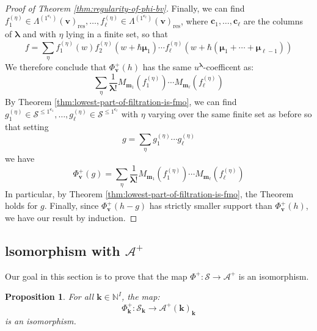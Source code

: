 \documentclass[11pt,reqno]{amsart}
\renewcommand{\mathbf}{\mathbold}
\numberwithin{equation}{section}
\newtheorem{Proposition}[equation]{Proposition}
\theoremstyle{definition}
\newcommand{\cA}{\mathcal{A}}
\newcommand{\cS}{\mathcal{S}}
\newcommand{\bc}{\mathbf{c}}
\newcommand{\bk}{\mathbf{k}}
\newcommand{\bm}{\mathbf{m}}
\newcommand{\bv}{\mathbf{v}}
\newcommand{\NN}{\mathbb{N}}
\renewcommand{\bv}{\mathbf{v}} %
\newcommand{\GT}{\Lambda}
\newcommand{\bla}{{\boldsymbol{\lambda}}}
\newcommand{\bmu}{{\boldsymbol{\mu}}}
\newcommand{\qzastplus}{\cA^{+}}
\newcommand{\res}{\mathrm{res}}
\newcommand{\shu}{\cS}
\begin{document}
\begin{proof}[Proof of Theorem \ref{thm:regularity-of-phi-bv}]
Finally, we can find $f_1^{(\eta)} \in \GT^{(1^{\bc_1})}(\bv)_{\res}, \ldots, f_\ell^{(\eta)} \in \GT^{(1^{\bc_\ell})}(\bv)_{\res}$, where $\bc_1, \ldots, \bc_\ell$ are the columns of $\bla$ and with $\eta$ lying in a finite set, so that
\begin{equation}
  \label{eq:42}
f = \sum_{\eta} f_1^{(\eta)}(w) f^{(\eta)}_2(w + \hbar \bmu_1) \cdots f_\ell^{(\eta)}(w + \hbar (\bmu_1 + \cdots + \bmu_{\ell-1}) )
\end{equation}
We therefore conclude that $\Phi^+_\bv(h)$ has the same $u^\bla$-coefficent as:
\begin{equation}
  \label{eq:43}
\sum_{\eta} \frac{1}{\bla!} M_{\bm_1}(f^{(\eta)}_1) \cdots M_{\bm_\ell}(f^{(\eta)}_\ell)
\end{equation}
By Theorem \ref{thm:lowest-part-of-filtration-is-fmo}, we can find
$g_1^{(\eta)} \in \cS^{\leq 1^{\bc_1}}, \ldots, g_\ell^{(\eta)} \in \cS^{\leq 1^{\bc_\ell}}$
with $\eta$ varying over the same finite set as before so that setting
\begin{equation}
  \label{eq:44}
  g = \sum_{\eta} g_1^{(\eta)} \cdots g_{\ell}^{(\eta)}
\end{equation}
we have
\begin{equation}
  \label{eq:45}
  \Phi^+_\bv(g) = \sum_{\eta} \frac{1}{\bla!} M_{\bm_1}(f^{(\eta)}_1) \cdots M_{\bm_\ell}(f^{(\eta)}_\ell)
\end{equation}
In particular, by Theorem \ref{thm:lowest-part-of-filtration-is-fmo}, the Theorem holds for $g$. Finally, since $\Phi^+_\bv(h-g)$ has strictly smaller support than $\Phi^+_\bv(h)$, we have our result by induction. 

\end{proof}





\subsection{lsomorphism with $\qzastplus$}


Our goal in this section is to prove that the map $\Phi^+: \shu \rightarrow \qzastplus$ is an isomorphism.
\begin{Proposition}
  \label{prop:shuf-bk-to-qzastplus-bk-isom}
For all $\bk \in \NN^I$, the map:
\begin{equation}
  \label{eq:9}
  \Phi^+_{\bk} : \cS_{\bk} \rightarrow \qzastplus(\bk)_{\bk} 
\end{equation}
 is an isomorphism. 
\end{Proposition}
\end{document}
